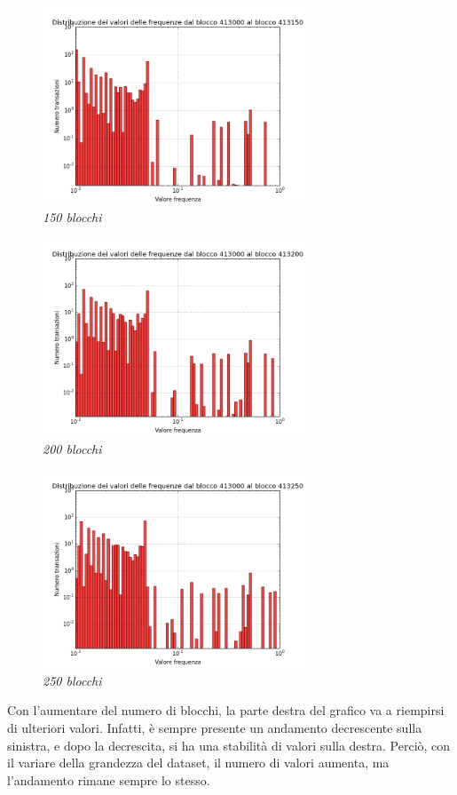 \begin{figure}[htbp]
	\centering
	\includegraphics[width=0.7\textwidth]{figure/hist150b}
	\caption{\textit{150 blocchi}\label{fig:hist150b}}
\end{figure}

\begin{figure}[htbp]
	\centering
	\includegraphics[width=0.7\textwidth]{figure/hist200b}
	\caption{\textit{200 blocchi}\label{fig:hist200b}}
\end{figure}

\begin{figure}[htbp]
	\centering
	\includegraphics[width=0.7\textwidth]{figure/hist250b}
	\caption{\textit{250 blocchi}\label{fig:hist250b}}
\end{figure}
\newpage
Con l'aumentare del numero di blocchi, la parte destra del grafico va a riempirsi di ulteriori valori. Infatti, è sempre presente un andamento decrescente sulla sinistra, e dopo la decrescita, si ha una stabilità di valori sulla destra. Perciò, con il variare della grandezza del dataset, il numero di valori aumenta, ma l'andamento rimane sempre lo stesso.

